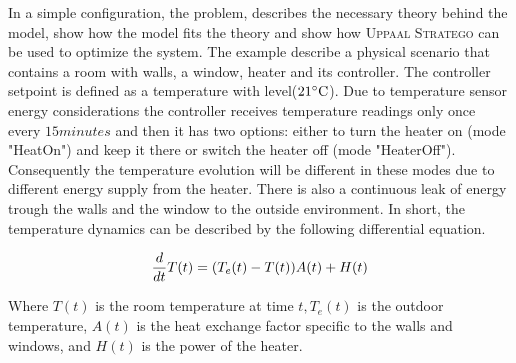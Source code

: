     In a simple configuration, the problem, describes the necessary theory 
    behind the model, show how the model fits the theory and show how 
    \textsc{Uppaal Stratego} can be used to optimize the system.
    The example describe a physical scenario that contains a room with 
    walls, a window, heater and its controller. The controller setpoint 
    is defined as a temperature with  level($21 \celsius$). Due to temperature
    sensor energy considerations the controller receives temperature
    readings only once every $15 minutes$ and then it has two options:
    either to turn the heater on (mode "HeatOn") and keep it there or 
    switch the heater off (mode "HeaterOff"). Consequently the temperature 
    evolution will be different in these modes due to different energy 
    supply from the heater. There is also a continuous leak of energy 
    trough the walls and the window to the outside environment. In 
    short, the temperature dynamics can be described by the following 
    differential equation.

    \begin{equation}
        \frac{d}{dt}T(t) = (T_e(t)-T(t))A(t)+H(t) \\
    \end{equation}

    Where $T(t)$ is the room temperature at time $t,T_e(t)$ is the 
    outdoor temperature, $A(t)$ is the heat exchange factor specific 
    to the walls and windows, and $H(t)$ is the power of the heater.
  
